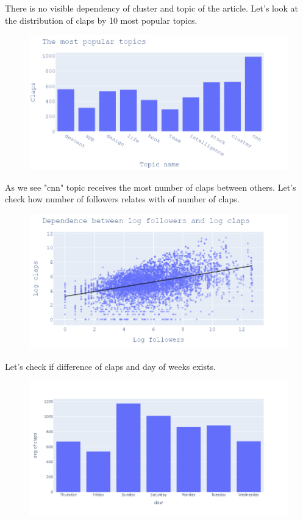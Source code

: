 \documentclass[12pt]{report}
\begin{document}
There is no visible dependency of cluster and topic of the article.
Let's look at the distribution of claps by 10 most popular topics.
\begin{figure}[H]
    \centering
    \includegraphics[scale=0.5]{eda4.png}
\end{figure}
As we see "cnn" topic receives the most number of claps between others. Let's check how number of followers relates with of number of claps.
\begin{figure}[H]
    \centering
    \includegraphics[scale=0.5]{eda5.png}
\end{figure}
Let's check if difference of claps and day of weeks exists.
\begin{figure}[H]
    \centering
    \includegraphics[scale=0.35]{eda6.png}
\end{figure}
\end{document}
